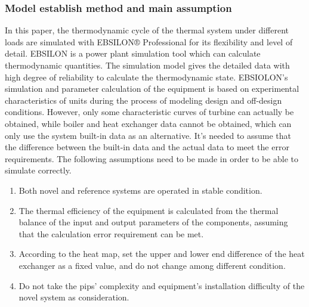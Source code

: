 \documentclass[preprint,12pt]{elsarticle}
\begin{document}
\subsubsection{Model establish method and main assumption}
\label{ssub3:modle description}
In this paper, the thermodynamic cycle of the thermal system under different loads are simulated with EBSILON® Professional for its flexibility and level of detail. 
EBSILON is a power plant simulation tool which can calculate thermodynamic quantities. 
The simulation model gives the detailed data with high degree of reliability to calculate the thermodynamic state.
EBSIOLON's simulation and parameter calculation of the equipment is based on experimental characteristics of units during the process of modeling design and off-design conditions.
However, only some characteristic curves of turbine can actually be obtained, while boiler and heat exchanger data cannot be obtained, which can only use the system built-in data as an alternative.
It’s needed to assume that the difference between the built-in data and the actual data to meet the error requirements.
The following assumptions need to be made in order to be able to simulate correctly.
\begin{enumerate}[(1)]
\item Both novel and reference systems are operated in stable condition.
\item The thermal efficiency of the equipment is calculated from the thermal balance of the input and output parameters of the components, assuming that the calculation error requirement can be met.
\item According to the heat map, set the upper and lower end difference of the heat exchanger as a fixed value, and do not change among different condition.
\item  Do not take the pips' complexity and equipment’s installation difficulty of the novel system as consideration.
\end{enumerate}
\end{document}
